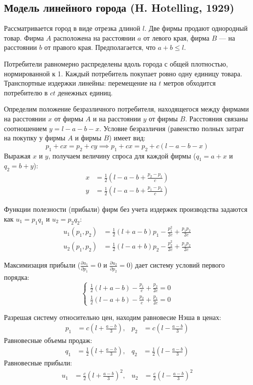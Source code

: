 \subsection{Модель линейного города (H. Hotelling, 1929)}

Рассматривается город в виде отрезка длиной $l$. Две фирмы продают однородный товар. Фирма $A$ расположена на расстоянии $a$ от левого края, фирма $B$ — на расстоянии $b$ от правого края. Предполагается, что $a + b \le l$. 

Потребители равномерно распределены вдоль города с общей плотностью, нормированной к 1. Каждый потребитель покупает ровно одну единицу товара. Транспортные издержки линейны: перемещение на $t$ метров обходится потребителю в $ct$ денежных единиц.

Определим положение безразличного потребителя, находящегося между фирмами на расстоянии $x$ от фирмы $A$ и на расстоянии $y$ от фирмы $B$. Расстояния связаны соотношением $y = l - a - b - x$. Условие безразличия (равенство полных затрат на покупку у фирмы $A$ и фирмы $B$) имеет вид:
\[
p_1 + cx = p_2 + c y \implies p_1 + cx = p_2 + c(l - a - b - x)
\]
Выражая $x$ и $y$, получаем величину спроса для каждой фирмы ($q_1 = a + x$ и $q_2 = b + y$):
\begin{align*}
x &= \frac{1}{2} \left( l - a - b + \frac{p_2 - p_1}{c} \right) \\
y &= \frac{1}{2} \left( l - a - b + \frac{p_1 - p_2}{c} \right)
\end{align*}

Функции полезности (прибыли) фирм без учета издержек производства задаются как $u_1 = p_1 q_1$ и $u_2 = p_2 q_2$:
\begin{align*}
u_1(p_1, p_2) &= \frac{1}{2} (l + a - b) p_1 - \frac{p_1^2}{2c} + \frac{p_1 p_2}{2c} \\
u_2(p_1, p_2) &= \frac{1}{2} (l - a + b) p_2 - \frac{p_2^2}{2c} + \frac{p_1 p_2}{2c}
\end{align*}

Максимизация прибыли ($\frac{\partial u_1}{\partial p_1} = 0$ и $\frac{\partial u_2}{\partial p_2} = 0$) дает систему условий первого порядка:
\[
\begin{cases} 
\frac{1}{2}(l + a - b) - \frac{p_1}{c} + \frac{p_2}{2c} = 0 \\
\frac{1}{2}(l - a + b) - \frac{p_2}{c} + \frac{p_1}{2c} = 0 
\end{cases}
\]

Разрешая систему относительно цен, находим равновесие Нэша в ценах:
\begin{align*}
p_1 &= c \left( l + \frac{a - b}{3} \right), & p_2 &= c \left( l - \frac{a - b}{3} \right)
\end{align*}
Равновесные объемы продаж:
\begin{align*}
q_1 &= \frac{1}{2} \left( l + \frac{a - b}{3} \right), & q_2 &= \frac{1}{2} \left( l - \frac{a - b}{3} \right)
\end{align*}
Равновесные прибыли:
\begin{align*}
u_1 &= \frac{c}{2} \left( l + \frac{a - b}{3} \right)^2, & u_2 &= \frac{c}{2} \left( l - \frac{a - b}{3} \right)^2
\end{align*}

